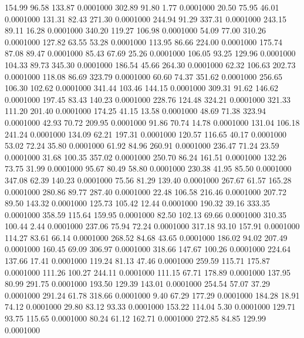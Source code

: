  154.99   96.58  133.87   0.0001000
 302.89   91.80    1.77   0.0001000
  20.50   75.95   46.01   0.0001000
 131.31   82.43  271.30   0.0001000
 244.94   91.29  337.31   0.0001000
 243.15   89.11   16.28   0.0001000
 340.20  119.27  106.98   0.0001000
  54.09   77.00  310.26   0.0001000
 127.82   63.55   53.28   0.0001000
 113.95   86.66  224.00   0.0001000
 175.74   87.08   89.47   0.0001000
  85.43   67.69   25.26   0.0001000
 106.05   93.25  129.96   0.0001000
 104.33   89.73  345.30   0.0001000
 186.54   45.66  264.30   0.0001000
  62.32  106.63  202.73   0.0001000
 118.08   86.69  323.79   0.0001000
  60.60   74.37  351.62   0.0001000
 256.65  106.30  102.62   0.0001000
 341.44  103.46  144.15   0.0001000
 309.31   91.62  146.62   0.0001000
 197.45   83.43  140.23   0.0001000
 228.76  124.48  324.21   0.0001000
 321.33  111.20  201.40   0.0001000
 174.25   41.15   13.58   0.0001000
  48.69   71.38  323.94   0.0001000
  42.93   70.72  209.95   0.0001000
  91.86   70.74   14.78   0.0001000
 131.04  106.18  241.24   0.0001000
 134.09   62.21  197.31   0.0001000
 120.57  116.65   40.17   0.0001000
  53.02   72.24   35.80   0.0001000
  61.92   84.96  260.91   0.0001000
 236.47   71.24   23.59   0.0001000
  31.68  100.35  357.02   0.0001000
 250.70   86.24  161.51   0.0001000
 132.26   73.75   31.99   0.0001000
  95.67   80.49   58.80   0.0001000
 230.38   41.95   85.50   0.0001000
 347.08   62.39  140.23   0.0001000
  75.56   81.29  139.40   0.0001000
 267.67   61.57  165.28   0.0001000
 280.86   89.77  287.40   0.0001000
  22.48  106.58  216.46   0.0001000
 207.72   89.50  143.32   0.0001000
 125.73  105.42   12.44   0.0001000
 190.32   39.16  333.35   0.0001000
 358.59  115.64  159.95   0.0001000
  82.50  102.13   69.66   0.0001000
 310.35  100.44    2.44   0.0001000
 237.06   75.94   72.24   0.0001000
 317.18   93.10  157.91   0.0001000
 114.27   83.61   66.14   0.0001000
 268.52   84.68   43.65   0.0001000
 186.02   94.02  207.49   0.0001000
 160.45   69.09  306.97   0.0001000
 318.66  147.67  100.26   0.0001000
 224.64  137.66   17.41   0.0001000
 119.24   81.13   47.46   0.0001000
 259.59  115.71  175.87   0.0001000
 111.26  100.27  244.11   0.0001000
 111.15   67.71  178.89   0.0001000
 137.95   80.99  291.75   0.0001000
 193.50  129.39  143.01   0.0001000
 254.54   57.07   37.29   0.0001000
 291.24   61.78  318.66   0.0001000
   9.40   67.29  177.29   0.0001000
 184.28   18.91   74.12   0.0001000
  29.80   83.12   93.33   0.0001000
 153.22  114.04    5.30   0.0001000
 129.71   93.75  115.65   0.0001000
  80.24   61.12  162.71   0.0001000
 272.85   84.85  129.99   0.0001000
